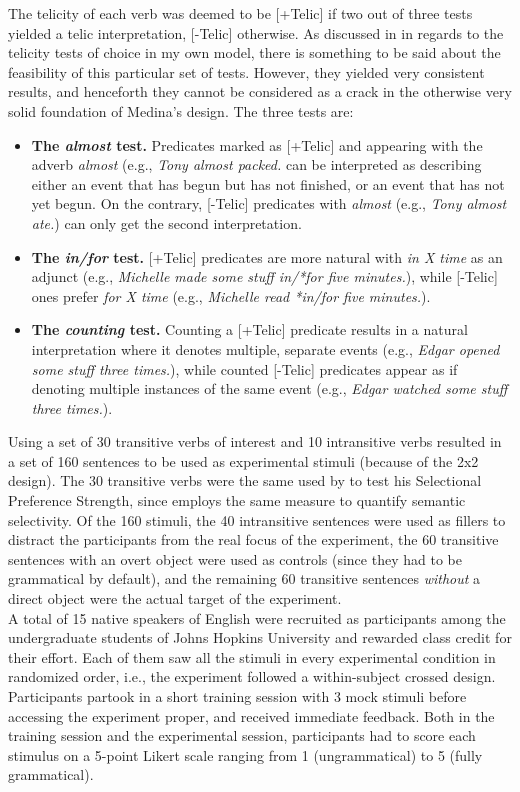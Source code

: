 The telicity of each verb was deemed to be [+Telic] if two out of three tests yielded a telic interpretation, [-Telic] otherwise. As discussed in  in regards to the telicity tests of choice in my own model, there is something to be said about the feasibility of this particular set of tests. However, they yielded very consistent results, and henceforth they cannot be considered as a crack in the otherwise very solid foundation of Medina's design. The three tests \parencite[302-303]{Medina2007} are:
\begin{itemize}
    \item \textbf{The \textit{almost} test.} Predicates marked as [+Telic] and appearing with the adverb \textit{almost} (e.g., \textit{Tony almost packed.} can be interpreted as describing either an event that has begun but has not finished, or an event that has not yet begun. On the contrary, [-Telic] predicates with \textit{almost} (e.g., \textit{Tony almost ate.}) can only get the second interpretation.
    \item \textbf{The \textit{in/for} test.} [+Telic] predicates are more natural with \textit{in X time} as an adjunct (e.g., \textit{Michelle made some stuff in/*for five minutes.}), while [-Telic] ones prefer \textit{for X time} (e.g., \textit{Michelle read *in/for five minutes.}).
    \item \textbf{The \textit{counting} test.} Counting a [+Telic] predicate results in a natural interpretation where it denotes multiple, separate events (e.g., \textit{Edgar opened some stuff three times.}), while counted [-Telic] predicates appear as if denoting multiple instances of the same event (e.g., \textit{Edgar watched some stuff three times.}).
\end{itemize}

Using a set of 30 transitive verbs of interest and 10 intransitive verbs resulted in a set of 160 sentences to be used as experimental stimuli (because of the 2x2 design). The 30 transitive verbs were the same used by \textcite{Resnik1993, Resnik1996} to test his Selectional Preference Strength, since \textcite{Medina2007} employs the same measure to quantify semantic selectivity. Of the 160 stimuli, the 40 intransitive sentences were used as fillers to distract the participants from the real focus of the experiment, the 60 transitive sentences with an overt object were used as controls (since they had to be grammatical by default), and the remaining 60 transitive sentences \textit{without} a direct object were the actual target of the experiment.\\
A total of 15 native speakers of English were recruited as participants among the undergraduate students of Johns Hopkins University and rewarded class credit for their effort. Each of them saw all the stimuli in every experimental condition in randomized order, i.e., the experiment followed a within-subject crossed design. Participants partook in a short training session with 3 mock stimuli before accessing the experiment proper, and received immediate feedback. Both in the training session and the experimental session, participants had to score each stimulus on a 5-point Likert scale ranging from 1 (ungrammatical) to 5 (fully grammatical).

